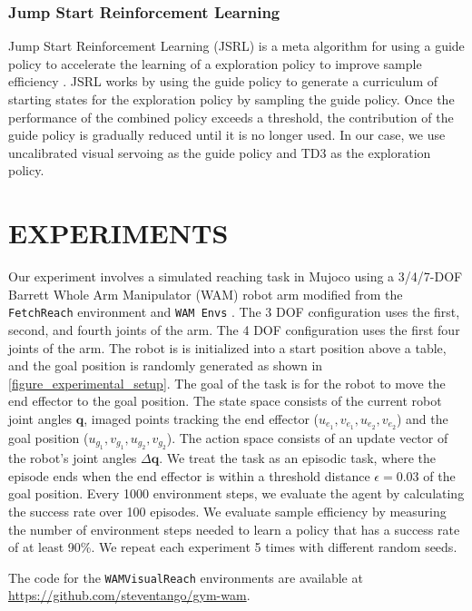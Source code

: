\documentclass[letterpaper, 10 pt, conference]{ieeeconf}  %
\begin{document}
\subsubsection{Jump Start Reinforcement Learning}

Jump Start Reinforcement Learning (JSRL) is a meta algorithm for using a guide policy to
accelerate the learning of a exploration policy to improve sample efficiency
\cite{Uchendu2022}. JSRL works by using the guide policy to generate a curriculum of
starting states for the exploration policy by sampling the guide policy. Once the
performance of the combined policy exceeds a threshold, the contribution of the guide
policy is gradually reduced until it is no longer used. In our case, we use uncalibrated
visual servoing as the guide policy and TD3 as the exploration policy.

\section{EXPERIMENTS} \label{Experiments}

Our experiment involves a simulated reaching task in Mujoco \cite{Todorov2012} using a
3/4/7-DOF Barrett Whole Arm Manipulator (WAM) robot arm modified from the
\texttt{FetchReach} environment \cite{Plappert2018} and \texttt{WAM Envs}
\cite{Johnstonbaugh2022}. The 3 DOF configuration uses the first, second, and fourth
joints of the arm. The 4 DOF configuration uses the first four joints of the arm. The
robot is is initialized into a start position above a table, and the goal position is
randomly generated as shown in \ref{figure_experimental_setup}. The goal of the task is
for the robot to move the end effector to the goal position. The state space consists of
the current robot joint angles $\mathbf{q}$, imaged points tracking the end effector
($u_{e_1}, v_{e_1}, u_{e_2}, v_{e_2}$) and the goal position ($u_{g_1}, v_{g_1}, u_{g_2}, v_{g_2}$). The action space consists
of an update vector of the robot's joint angles $\Delta \mathbf{q}$. We treat the task
as an episodic task, where the episode ends when the end effector is within a threshold
distance $\epsilon = 0.03$ of the goal position. Every 1000 environment steps, we
evaluate the agent by calculating the success rate over 100 episodes. We evaluate sample
efficiency by measuring the number of environment steps needed to learn a policy that
has a success rate of at least 90\%. We repeat each experiment 5 times with different
random seeds.

The code for the \texttt{WAMVisualReach} environments are available at
\url{https://github.com/steventango/gym-wam}.
\end{document}
